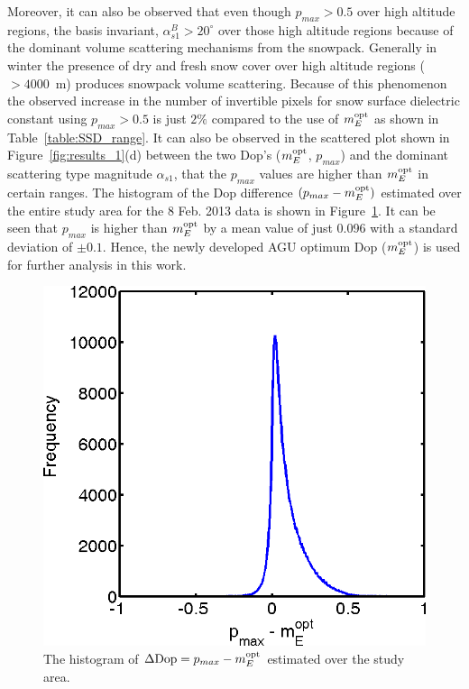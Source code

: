 Moreover, it can also be observed that even though $p_{max} > 0.5$ over high altitude regions, the basis invariant, $\alpha_{s1}^{B} > 20^\circ$ over those high altitude regions because of the dominant volume scattering mechanisms from the snowpack. Generally in winter the presence of dry and fresh snow cover over high altitude regions ($> 4000$~m) produces snowpack volume scattering. Because of this phenomenon the observed increase in the number of invertible pixels for snow surface dielectric constant using $p_{max} > 0.5$ is just $2\%$ compared to the use of $m_{E}^{\mbox{\scriptsize opt}}$ as shown in Table~\ref{table:SSD_range}. It can also be observed in the scattered plot shown in Figure~\ref{fig:results_1}(d) between the two Dop's ($m_{E}^{\mbox{\scriptsize opt}}$, $p_{max}$) and the dominant scattering type magnitude $\alpha_{s1}$, that the $p_{max}$ values are higher than $m_{E}^{\mbox{\scriptsize opt}}$ in certain ranges. The histogram of the Dop difference $(p_{max} - m_{E}^{\mbox{\scriptsize opt}})$ estimated over the entire study area for the 8 Feb. 2013 data is shown in Figure~\ref{fig:dop_diff}. It can be seen that $p_{max}$ is higher than $m_{E}^{\mbox{\scriptsize opt}}$ by a mean value of just 0.096 with a standard deviation of $\pm 0.1$. Hence, the newly developed AGU optimum Dop ($m_{E}^{\mbox{\scriptsize opt}}$) is used for further analysis in this work.
\begin{figure}[!htbp]
	\centering
	\includegraphics[width=0.6\columnwidth]{Figures_SSD/dop_diff} 
	\caption [Histogram of the Dop differences]{The histogram of $\Delta\mbox{Dop}=p_{max}-m_{E}^{\mbox{\scriptsize opt}}$ estimated over the study area.}
	\label{fig:dop_diff}
\end{figure}

